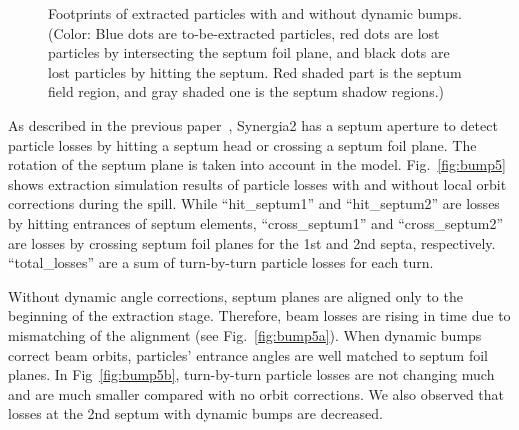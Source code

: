 \documentclass[aps,prstab,onecolumn,preprint]{revtex4-1}
\begin{document}
\begin{figure}[!tbp]
  \caption{\label{fig:bump4}Footprints of extracted particles with and without dynamic bumps. (Color: Blue dots are to-be-extracted particles, red dots are lost particles by intersecting the septum foil plane, and black dots are lost particles by hitting the septum. Red shaded part is the septum field region, and gray shaded one is the septum shadow regions.)}
\end{figure}

As described in the previous paper~\cite{mu2e}, Synergia2 has a septum aperture to detect particle losses by hitting a septum head or crossing a septum foil plane. The rotation of the septum plane is taken into account in the model. Fig.~\ref{fig:bump5} shows extraction simulation results of particle losses with and without local orbit corrections during the spill. While ``hit\_septum1'' and ``hit\_septum2'' are losses by hitting entrances of septum elements, ``cross\_septum1'' and ``cross\_septum2'' are losses by crossing septum foil planes for the 1st and 2nd septa, respectively. ``total\_losses'' are a sum of turn-by-turn particle losses for each turn.

Without dynamic angle corrections, septum planes are aligned only to the beginning of the extraction stage. Therefore, beam losses are rising in time due to mismatching of the alignment (see Fig.~\ref{fig:bump5a}). When dynamic bumps correct beam orbits, particles' entrance angles are well matched to septum foil planes. In Fig~\ref{fig:bump5b}, turn-by-turn particle losses are not changing much and are much smaller compared with no orbit corrections. We also observed that losses at the 2nd septum with dynamic bumps are decreased.
\end{document}
